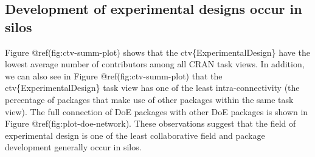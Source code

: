 \documentclass{article}
\begin{document}
\hypertarget{silo}{%
\subsection{Development of experimental designs occur in
silos}\label{silo}}

Figure @ref(fig:ctv-summ-plot) shows that the ctv\{ExperimentalDesign\}
have the lowest average number of contributors among all CRAN task
views. In addition, we can also see in Figure @ref(fig:ctv-summ-plot)
that the ctv\{ExperimentalDesign\} task view has one of the least
intra-connectivity (the percentage of packages that make use of other
packages within the same task view). The full connection of DoE packages
with other DoE packages is shown in Figure @ref(fig:plot-doe-network).
These observations suggest that the field of experimental design is one
of the least collaborative field and package development generally occur
in silos.
\end{document}
